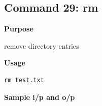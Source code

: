 \subsection{Command 29: rm} 
\textbf{Purpose}
\begin{flushleft}
 remove directory entries
\end{flushleft}
\textbf{Usage}
\begin{verbatim}
rm test.txt
\end{verbatim}
\textbf{Sample i/p and o/p}
\begin{figure}[H] 
\end{figure}
